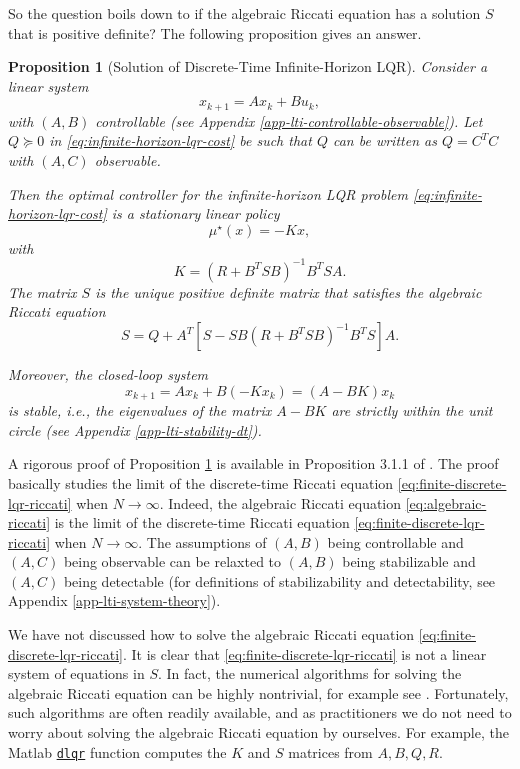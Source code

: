 \documentclass[
]{book}
\newtheorem{proposition}{Proposition}[chapter]
\theoremstyle{definition}
\theoremstyle{definition}
\theoremstyle{definition}
\theoremstyle{definition}
\theoremstyle{remark}
\begin{document}
So the question boils down to if the algebraic Riccati equation has a solution \(S\) that is positive definite? The following proposition gives an answer.

\begin{proposition}[Solution of Discrete-Time Infinite-Horizon LQR]
\protect\hypertarget{prp:infinitehorizonlqrsolution}{}\label{prp:infinitehorizonlqrsolution}Consider a linear system
\[
x_{k+1} = A x_k + B u_k,
\]
with \((A,B)\) controllable (see Appendix \ref{app-lti-controllable-observable}). Let \(Q \succeq 0\) in \eqref{eq:infinite-horizon-lqr-cost} be such that \(Q\) can be written as \(Q = C^T C\) with \((A,C)\) observable.

Then the optimal controller for the infinite-horizon LQR problem \eqref{eq:infinite-horizon-lqr-cost} is a stationary linear policy
\[
\mu^\star (x) = - K x,
\]
with
\[
K = \left( R + B^T S B \right)^{-1} B^T S A.
\]
The matrix \(S\) is the unique positive definite matrix that satisfies the algebraic Riccati equation
\[
S = Q + A^T \left[  S - SB \left( R + B^T S B  \right)^{-1} B^T S \right] A.
\]

Moreover, the closed-loop system
\[
x_{k+1} = A x_k + B (-K x_k) = (A - BK) x_k
\]
is stable, i.e., the eigenvalues of the matrix \(A - BK\) are strictly within the unit circle (see Appendix \ref{app-lti-stability-dt}).
\end{proposition}

A rigorous proof of Proposition \ref{prp:infinitehorizonlqrsolution} is available in Proposition 3.1.1 of \citep{bertsekas12book-dpocI}. The proof basically studies the limit of the discrete-time Riccati equation \eqref{eq:finite-discrete-lqr-riccati} when \(N \rightarrow \infty\). Indeed, the algebraic Riccati equation \eqref{eq:algebraic-riccati} is the limit of the discrete-time Riccati equation \eqref{eq:finite-discrete-lqr-riccati} when \(N \rightarrow \infty\). The assumptions of \((A,B)\) being controllable and \((A,C)\) being observable can be relaxted to \((A,B)\) being stabilizable and \((A,C)\) being detectable (for definitions of stabilizability and detectability, see Appendix \ref{app-lti-system-theory}).

We have not discussed how to solve the algebraic Riccati equation \eqref{eq:finite-discrete-lqr-riccati}. It is clear that \eqref{eq:finite-discrete-lqr-riccati} is not a linear system of equations in \(S\). In fact, the numerical algorithms for solving the algebraic Riccati equation can be highly nontrivial, for example see \citep{arnold84ieee-generalized}. Fortunately, such algorithms are often readily available, and as practitioners we do not need to worry about solving the algebraic Riccati equation by ourselves. For example, the Matlab \href{https://www.mathworks.com/help/control/ref/dlqr.html}{\texttt{dlqr}} function computes the \(K\) and \(S\) matrices from \(A,B,Q,R\).
\end{document}
